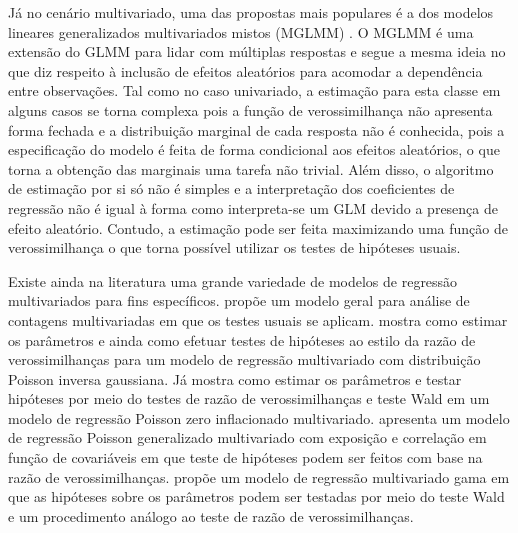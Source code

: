 Já no cenário multivariado, uma das propostas mais populares é a dos modelos lineares generalizados multivariados mistos (MGLMM) \citep{berridge2019multivariate}. O MGLMM é uma extensão do GLMM para lidar com múltiplas respostas e segue a mesma ideia no que diz respeito à inclusão de efeitos aleatórios para acomodar a dependência entre observações. Tal como no caso univariado, a estimação para esta classe em alguns casos se torna complexa pois a função de verossimilhança não apresenta forma fechada e a distribuição marginal de cada resposta não é conhecida, pois a especificação do modelo é feita de forma condicional aos efeitos aleatórios, o que torna a obtenção das marginais uma tarefa não trivial. Além disso, o algoritmo de estimação por si só não é simples e a interpretação dos coeficientes de regressão não é igual à forma como interpreta-se um GLM devido a presença de efeito aleatório. Contudo, a estimação pode ser feita maximizando uma função de verossimilhança o que torna possível utilizar os testes de hipóteses usuais. 


Existe ainda na literatura uma grande variedade de modelos de regressão multivariados para fins específicos. \citet{zhang2017regression} propõe um modelo geral para análise de contagens multivariadas em que os testes usuais se aplicam. \citet{mardalena2020parameter} mostra como estimar os parâmetros e ainda como efetuar testes de hipóteses ao estilo da razão de verossimilhanças para um modelo de regressão multivariado com distribuição Poisson inversa gaussiana. Já \citet{sari2021estimation} mostra como estimar os parâmetros e testar hipóteses por meio do testes de razão de verossimilhanças e teste Wald em um modelo de regressão Poisson zero inflacionado multivariado. \citet{berliana2019multivariate} apresenta um modelo de regressão Poisson generalizado multivariado com exposição e correlação em função de covariáveis em que teste de hipóteses podem ser feitos com base na razão de verossimilhanças. \citet{rahayu2020multivariate} propõe um modelo de regressão multivariado gama em que as hipóteses sobre os parâmetros podem ser testadas por meio do teste Wald e um procedimento análogo ao teste de razão de verossimilhanças.

